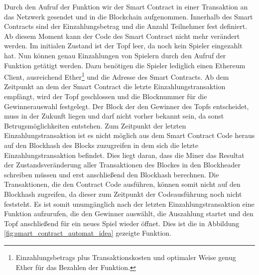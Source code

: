 Durch den Aufruf der  Funktion wir der Smart Contract in einer Transaktion an das Netzwerk gesendet und in die Blockchain aufgenommen. Innerhalb des Smart Contracts sind der Einzahlungsbetrag und die Anzahl Teilnehmer  fest definiert. Ab diesem Moment kann der Code des Smart Contract nicht mehr verändert werden. Im initialen Zustand ist der Topf leer, da noch kein Spieler eingezahlt hat. Nun können genau  Einzahlungen von Spielern durch den Aufruf der  Funktion getätigt werden. Dazu benötigen die Spieler lediglich einen Ethereum Client, ausreichend Ether\footnote{Einzahlungsbetrags plus Transaktionskosten und optimaler Weise genug Ether für das Bezahlen der  Funktion.} und die Adresse des Smart Contracts. Ab dem Zeitpunkt an dem der Smart Contract die letzte Einzahlungstransaktion empfängt, wird der Topf geschlossen und die Blocknummer für die Gewinnerauswahl festgelegt. Der Block der den Gewinner des Topfs entscheidet, muss in der Zukunft liegen und darf nicht vorher bekannt sein, da sonst Betrugsmöglichkeiten entstehen. Zum Zeitpunkt der letzten Einzahlungstransaktion ist es nicht möglich aus dem Smart Contract Code heraus auf den Blockhash des Blocks zuzugreifen in dem sich die letzte Einzahlungstransaktion befindet. Dies liegt daran, dass die Miner das Resultat der Zustandsveränderung aller Transaktionen des Blockes in den Blockheader schreiben müssen und erst anschließend den Blockhash berechnen. Die Transaktionen, die den Contract Code ausführen, können somit nicht auf den Blockhash zugreifen, da dieser zum Zeitpunkt der Codeausführung noch nicht feststeht. Es ist somit unumgänglich nach der letzten Einzahlungstransaktion eine Funktion aufzurufen, die den Gewinner auswählt, die Auszahlung startet und den Topf anschließend für ein neues Spiel wieder öffnet. Dies ist die in Abbildung \ref{fig:smart_contract_automat_idea} gezeigte  Funktion.